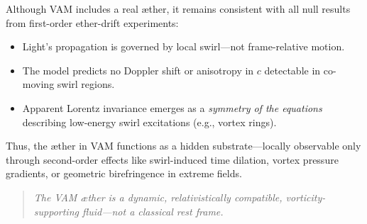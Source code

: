         Although VAM includes a real æther, it remains consistent with all null results from first-order ether-drift experiments:

        \begin{itemize}
            \item Light’s propagation is governed by local swirl—not frame-relative motion.
            \item The model predicts no Doppler shift or anisotropy in $c$ detectable in co-moving swirl regions.
            \item Apparent Lorentz invariance emerges as a \emph{symmetry of the equations} describing low-energy swirl excitations (e.g., vortex rings).
        \end{itemize}

        Thus, the æther in VAM functions as a hidden substrate—locally observable only through second-order effects like swirl-induced time dilation, vortex pressure gradients, or geometric birefringence in extreme fields.

        \begin{quote}
                \emph{The VAM æther is a dynamic, relativistically compatible, vorticity-supporting fluid---not a classical rest frame.}
        \end{quote}
